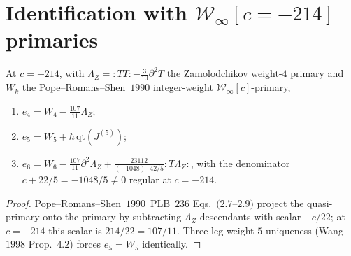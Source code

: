 \section{Identification with $\mathcal W_\infty[c=-214]$ primaries}
\label{sec:winfinity-ident}

\begin{theorem}
\label{thm:ek-winfinity-vol3}
\ClaimStatusProvedHere
At $c=-214$, with $\Lambda_Z={:}TT{:}-\tfrac{3}{10}\partial^2T$ the
Zamolodchikov weight-$4$ primary and $W_k$ the
Pope--Romans--Shen~$1990$ integer-weight
$\mathcal W_\infty[c]$-primary,
\begin{enumerate}
\item $e_4=W_4-\tfrac{107}{11}\Lambda_Z$;
\item $e_5=W_5+\hbar\,\mathrm{qt}(J^{(5)})$;
\item $e_6=W_6-\tfrac{107}{11}\partial^2\Lambda_Z
         +\tfrac{23112}{(-1048)\cdot 42/5}{:}T\Lambda_Z{:}$,
with the denominator $c+22/5=-1048/5\ne 0$ regular at $c=-214$.
\end{enumerate}
\end{theorem}

\begin{proof}
Pope--Romans--Shen~$1990$~PLB~$236$ Eqs.~$(2.7$--$2.9)$ project
the quasi-primary onto the primary by subtracting
$\Lambda_Z$-descendants with scalar $-c/22$; at $c=-214$
this scalar is $214/22=107/11$. Three-leg weight-$5$
uniqueness (Wang~$1998$ Prop.~$4.2$) forces
$e_5=W_5$ identically.
\end{proof}

